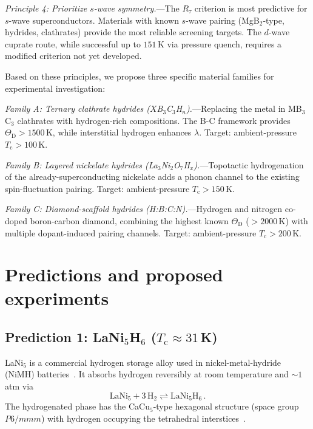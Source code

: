 \documentclass[prb,twocolumn,superscriptaddress,longbibliography,floatfix]{revtex4-2}
\newcommand{\tauasym}{\tau}
\newcommand{\Rtau}{R_{\tauasym}}
\newcommand{\Tc}{T_{\mathrm{c}}}
\newcommand{\ThetaD}{\Theta_{\mathrm{D}}}
\begin{document}
\emph{Principle 4: Prioritize $s$-wave symmetry.}---The $\Rtau$
criterion is most predictive for $s$-wave superconductors.
Materials with known $s$-wave pairing (MgB$_2$-type, hydrides,
clathrates) provide the most reliable screening targets.  The
$d$-wave cuprate route, while successful up to $151\,$K via
pressure quench, requires a modified criterion not yet developed.

Based on these principles, we propose three specific material
families for experimental investigation:

\emph{Family A: Ternary clathrate hydrides
($X$B$_3$C$_3$H$_n$).}---Replacing the metal in MB$_3$C$_3$
clathrates with hydrogen-rich compositions.  The B-C framework
provides $\ThetaD > 1500\,$K, while interstitial hydrogen
enhances $\lambda$.  Target: ambient-pressure
$\Tc > 100\,$K.

\emph{Family B: Layered nickelate hydrides
(La$_3$Ni$_2$O$_7$H$_x$).}---Topotactic hydrogenation of the
already-superconducting nickelate adds a phonon channel to the
existing spin-fluctuation pairing.  Target: ambient-pressure
$\Tc > 150\,$K.

\emph{Family C: Diamond-scaffold hydrides
(H:B:C:N).}---Hydrogen and nitrogen co-doped boron-carbon
diamond, combining the highest known $\ThetaD$ ($> 2000\,$K) with
multiple dopant-induced pairing channels.  Target:
ambient-pressure $\Tc > 200\,$K.

\section{Predictions and proposed experiments}
\label{sec:predictions}

\subsection{Prediction 1: LaNi$_5$H$_6$ ($\Tc \approx 31\,$K)}

LaNi$_5$ is a commercial hydrogen storage alloy used in
nickel-metal-hydride (NiMH) batteries~\cite{VanVucht1970}.
It absorbs hydrogen reversibly at room temperature and
$\sim 1\,$atm via
\begin{equation}\label{eq:LaNi5_reaction}
  \mathrm{LaNi}_5 + 3\,\mathrm{H}_2 \rightleftharpoons
  \mathrm{LaNi}_5\mathrm{H}_6\,.
\end{equation}
The hydrogenated phase has the CaCu$_5$-type hexagonal structure
(space group $P6/mmm$) with hydrogen occupying the tetrahedral
interstices~\cite{Percheron-Guegan1985}.
\end{document}
